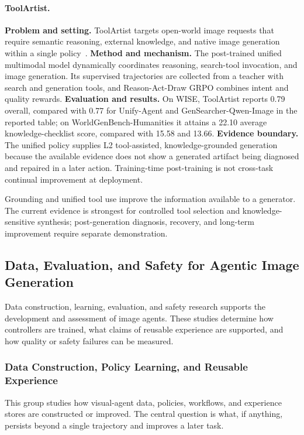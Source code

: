 \paragraph{ToolArtist.}
\textbf{Problem and setting.} ToolArtist targets open-world image requests that require semantic reasoning, external knowledge, and native image generation within a single policy~\cite{zhao2026toolartist}. \textbf{Method and mechanism.} The post-trained unified multimodal model dynamically coordinates reasoning, search-tool invocation, and image generation. Its supervised trajectories are collected from a teacher with search and generation tools, and Reason-Act-Draw GRPO combines intent and quality rewards. \textbf{Evaluation and results.} On WISE, ToolArtist reports 0.79 overall, compared with 0.77 for Unify-Agent and GenSearcher-Qwen-Image in the reported table; on WorldGenBench-Humanities it attains a 22.10 average knowledge-checklist score, compared with 15.58 and 13.66. \textbf{Evidence boundary.} The unified policy supplies L2 tool-assisted, knowledge-grounded generation because the available evidence does not show a generated artifact being diagnosed and repaired in a later action. Training-time post-training is not cross-task continual improvement at deployment.

Grounding and unified tool use improve the information available to a generator. The current evidence is strongest for controlled tool selection and knowledge-sensitive synthesis; post-generation diagnosis, recovery, and long-term improvement require separate demonstration.

\subsection{Data, Evaluation, and Safety for Agentic Image Generation}
Data construction, learning, evaluation, and safety research supports the development and assessment of image agents. These studies determine how controllers are trained, what claims of reusable experience are supported, and how quality or safety failures can be measured.

\subsubsection{Data Construction, Policy Learning, and Reusable Experience}
This group studies how visual-agent data, policies, workflows, and experience stores are constructed or improved. The central question is what, if anything, persists beyond a single trajectory and improves a later task.

